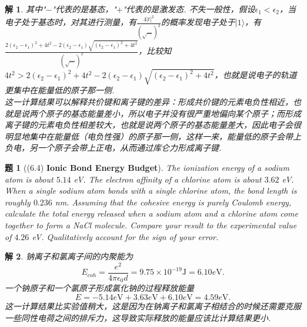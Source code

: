 \documentclass[UTF8,10pt,a4paper]{article}
\theoremstyle{Problem}
\newtheorem{prob}{题}
\theoremstyle{Solution}
\newtheorem*{sol}{解}
\providecommand{\abs}[1]{\left\lvert#1\right\rvert}
\begin{document}
\begin{sol}
    其中"$-$"代表的是基态，"$+$"代表的是激发态. 不失一般性，假设$\epsilon_1<\epsilon_2$，当电子处于基态时，对其进行测量，有$\frac{4\abs{t}^2}{(\sqrt{\dots})^2}$的概率发现电子处于$\lvert 1\rangle$，有$\frac{2(\epsilon_2-\epsilon_1)^2+4t^2-2(\epsilon_2-\epsilon_1)\sqrt{(\epsilon_2-\epsilon_1)^2+4t^2}}{(\sqrt{\dots})^2}$，比较知$4t^2>2(\epsilon_2-\epsilon_1)^2+4t^2-2(\epsilon_2-\epsilon_1)\sqrt{(\epsilon_2-\epsilon_1)^2+4t^2}$，也就是说电子的轨道更集中在能量低的原子那一侧.\\
    这一计算结果可以解释共价键和离子键的差异：形成共价键的元素电负性相近，也就是说两个原子的基态能量差小，所以电子并没有很严重地偏向某个原子；而形成离子键的元素电负性相差较大，也就是说两个原子的基态能量差大，因此电子会很明显地集中在能量低（电负性强）的原子那一侧，这样一来，能量低的原子会带上负电，另一个原子会带上正电，从而通过库仑力形成离子键.
\end{sol}

\begin{prob}[(6.4) \textbf{Ionic Bond Energy Budget}]
    The ionization energy of a sodium atom is about $5.14$ eV. The electron affinity of a chlorine atom is about $3.62$ eV. When a single sodium atom bonds with a single chlorine atom, the bond length is roughly $0.236$ nm. Assuming that the cohesive energy is purely Coulomb energy, calculate the total energy released when a sodium atom and a chlorine atom come together to form a NaCl molecule. Compare your result to the experimental value of $4.26$ eV. Qualitatively account for the sign of your error.
\end{prob}
\begin{sol}
    钠离子和氯离子间的内聚能为
    \begin{equation}
        E_{coh}=\frac{e^2}{4\pi\epsilon_0d}=9.75\times 10^{-19}\text{J}=6.10e\text{V}.
    \end{equation}
    一个钠原子和一个氯原子形成氯化钠的过程释放能量
    \begin{equation}
        E=-5.14e\text{V}+3.63e\text{V}+6.10e\text{V}=4.59e\text{V}.
    \end{equation}
    这一计算结果比实验值稍大，这是因为在钠离子和氯离子相结合的时候还需要克服一些同性电荷之间的排斥力，这导致实际释放的能量应该比计算结果更小.
\end{sol}
\end{document}
